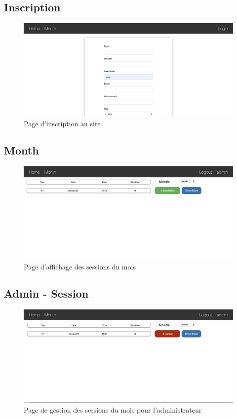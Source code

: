        	
	\newpage
	\subsection{Inscription}
		\begin{figure}[!htbp]
       	 	\includegraphics[width=0.8\linewidth, center]{Mockup/Inscription.png}
       	 	\caption{Page d'inscription au site}
       	\end{figure}
    
       
      \vspace{\baselineskip}
	\subsection{Month}
		\begin{figure}[h!]
       	 	\includegraphics[width=0.8\linewidth, center]{Mockup/Month.png}
       	 	\caption{Page d'affichage des sessions du mois}
       	\end{figure}
       	

	\newpage
	\subsection{Admin - Session}
		\begin{figure}[h!]
       	 	\includegraphics[width=0.8\linewidth, center]{Mockup/Admin-Session.png}
       	 	\caption{Page de gestion des sessions du mois pour l'administrateur}
       	\end{figure}
       	
